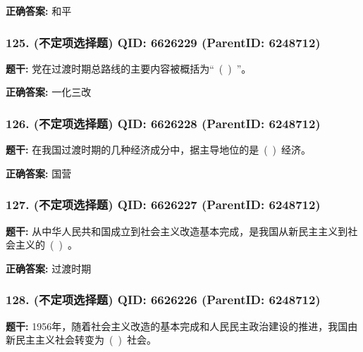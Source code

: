 \documentclass[12pt,UTF8]{ctexart}
\begin{document}
\textbf{正确答案:}
和平

\vspace{0.3em}\hrulefill\vspace{0.7em}

\subsubsection*{125. (不定项选择题) \small QID: 6626229 (ParentID: 6248712)}

\textbf{题干:}
党在过渡时期总路线的主要内容被概括为“ ( ) ”。



\textbf{正确答案:}
一化三改

\vspace{0.3em}\hrulefill\vspace{0.7em}

\subsubsection*{126. (不定项选择题) \small QID: 6626228 (ParentID: 6248712)}

\textbf{题干:}
在我国过渡时期的几种经济成分中，据主导地位的是 ( ) 经济。



\textbf{正确答案:}
国营

\vspace{0.3em}\hrulefill\vspace{0.7em}

\subsubsection*{127. (不定项选择题) \small QID: 6626227 (ParentID: 6248712)}

\textbf{题干:}
从中华人民共和国成立到社会主义改造基本完成，是我国从新民主主义到社会主义的 ( ) 。



\textbf{正确答案:}
过渡时期

\vspace{0.3em}\hrulefill\vspace{0.7em}

\subsubsection*{128. (不定项选择题) \small QID: 6626226 (ParentID: 6248712)}

\textbf{题干:}
1956年，随着社会主义改造的基本完成和人民民主政治建设的推进，我国由新民主主义社会转变为 ( ) 社会。
\end{document}
